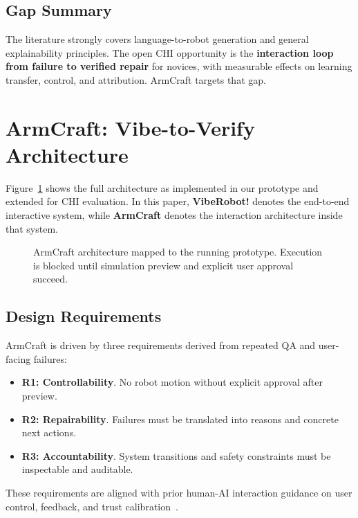 \documentclass[sigconf,review,anonymous]{acmart}
\begin{document}
\subsection{Gap Summary}
The literature strongly covers language-to-robot generation and general explainability principles. The open CHI opportunity is the \textbf{interaction loop from failure to verified repair} for novices, with measurable effects on learning transfer, control, and attribution. ArmCraft targets that gap.

\section{ArmCraft: Vibe-to-Verify Architecture}
Figure~\ref{fig:system-overview} shows the full architecture as implemented in our prototype and extended for CHI evaluation.
In this paper, \textbf{VibeRobot!} denotes the end-to-end interactive system, while \textbf{ArmCraft} denotes the interaction architecture inside that system.

\begin{figure}[t]
  \centering
  \resizebox{\textwidth}{!}{}
  \caption{ArmCraft architecture mapped to the running prototype. Execution is blocked until simulation preview and explicit user approval succeed.}
  \label{fig:system-overview}
\end{figure}

\subsection{Design Requirements}
ArmCraft is driven by three requirements derived from repeated QA and user-facing failures:
\begin{itemize}
  \item \textbf{R1: Controllability}. No robot motion without explicit approval after preview.
  \item \textbf{R2: Repairability}. Failures must be translated into reasons and concrete next actions.
  \item \textbf{R3: Accountability}. System transitions and safety constraints must be inspectable and auditable.
\end{itemize}
These requirements are aligned with prior human-AI interaction guidance on user control, feedback, and trust calibration~\cite{amershi2019guidelines,lee2004trust}.
\end{document}
